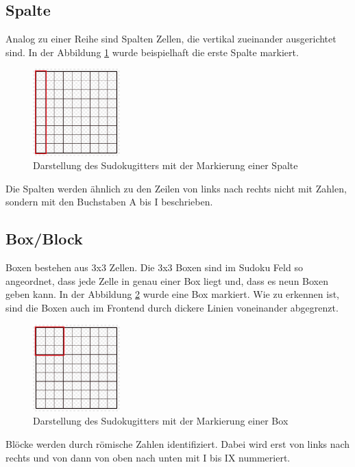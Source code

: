 \subsection{Spalte}
Analog zu einer Reihe sind Spalten Zellen, die vertikal zueinander ausgerichtet sind. In der Abbildung \ref{fig:SudokugitterSpalte} wurde beispielhaft die erste Spalte markiert.
\begin{figure}[H]
	\centering
	\includegraphics[width=0.3\textwidth]{images/sudokugitterSpalte.jpg}
	\caption{Darstellung des Sudokugitters mit der Markierung einer Spalte}
	\label{fig:SudokugitterSpalte}
\end{figure}
Die Spalten werden ähnlich zu den Zeilen von links nach rechts nicht mit Zahlen, sondern mit den Buchstaben A bis I beschrieben.

\subsection{Box/Block}
Boxen bestehen aus 3x3 Zellen. Die 3x3 Boxen sind im Sudoku Feld so angeordnet, dass jede Zelle in genau einer Box liegt und, dass es neun Boxen geben kann. In der Abbildung \ref{fig:SudokugitterBox} wurde eine Box markiert. Wie zu erkennen ist, sind die Boxen auch im Frontend durch dickere Linien voneinander abgegrenzt. 
\begin{figure}[H]
	\centering
	\includegraphics[width=0.3\textwidth]{images/sudokugitterBox.jpg}
	\caption{Darstellung des Sudokugitters mit der Markierung einer Box}
	\label{fig:SudokugitterBox}
\end{figure}
Blöcke werden durch römische Zahlen identifiziert. Dabei wird erst von links nach rechts und von dann von oben nach unten mit I bis IX nummeriert.

